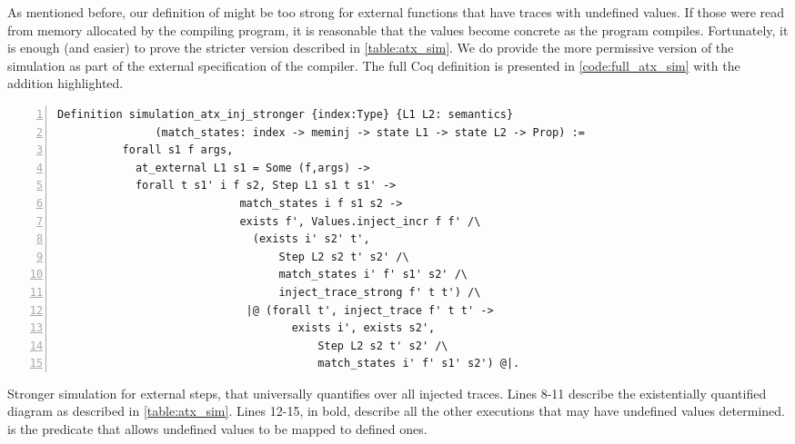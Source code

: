 As mentioned before, our definition of  might be too strong for external functions that have traces with undefined values. If those were read from memory allocated by the compiling program, it is reasonable that the values become concrete as the program compiles. Fortunately, it is enough (and easier) to prove the stricter version described in \ref{table:atx_sim}. We do provide the more permissive version of the simulation as part of the external specification of the compiler. The full Coq definition is presented in \ref{code:full_atx_sim} with the addition highlighted.  

\begin{table}\label{fig:simulation_atxX}
\begin{lstlisting}[numbers=left] 
Definition simulation_atx_inj_stronger {index:Type} {L1 L2: semantics}
               (match_states: index -> meminj -> state L1 -> state L2 -> Prop) :=
          forall s1 f args,
            at_external L1 s1 = Some (f,args) -> 
            forall t s1' i f s2, Step L1 s1 t s1' ->
                            match_states i f s1 s2 ->
                            exists f', Values.inject_incr f f' /\
                              (exists i' s2' t',
                                  Step L2 s2 t' s2' /\
                                  match_states i' f' s1' s2' /\
                                  inject_trace_strong f' t t') /\
                             |@ (forall t', inject_trace f' t t' -> 
                              		exists i', exists s2',
                                    	Step L2 s2 t' s2' /\
                                    	match_states i' f' s1' s2') @|.
\end{lstlisting}
\caption{Stronger simulation for external steps, that universally quantifies over all injected traces. Lines 8-11 describe the existentially quantified diagram as described in \ref{table:atx_sim}. Lines 12-15, in bold, describe all the other executions that may have undefined values determined.  is the predicate that allows undefined values to be mapped to defined ones. }\label{code:full_atx_sim}
\end{table}

